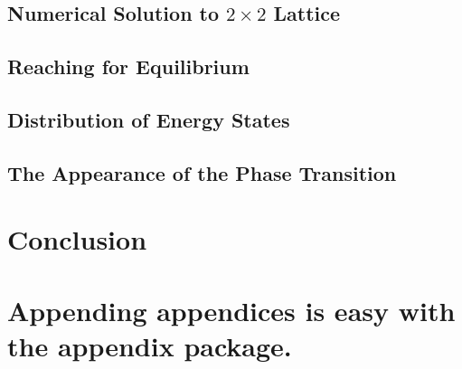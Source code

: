 \documentclass[aps,reprint]{revtex4-1}
\newcommand\blankpage{%
  \null
  \thispagestyle{empty}%
  \addtocounter{page}{-1}%
  \newpage}
\begin{document}
\subsection{Numerical Solution to $2\times 2$ Lattice}

\subsection{Reaching for Equilibrium}
\label{sec:reaching-equilibrium-2}


\subsection{Distribution of Energy States}
\label{sec:distr-energy-stat-2}

\subsection{The Appearance of the Phase Transition}
\label{sec:appe-phase-trans-2}

\section{Conclusion}
\label{sec:conclusion}


\blankpage
\appendix
\section{Appending appendices is easy with the appendix package.}
\blankpage
\end{document}
